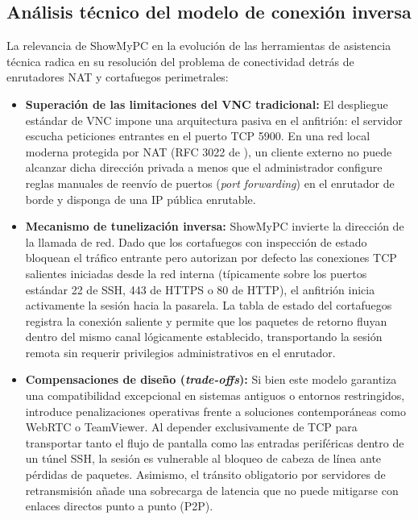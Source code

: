 \documentclass[12pt]{article}
\begin{document}
\subsection{Análisis técnico del modelo de conexión inversa}\label{sec:showmypcConexionInversa}

La relevancia de ShowMyPC en la evolución de las herramientas de asistencia técnica radica en su resolución del problema de conectividad detrás de enrutadores NAT y cortafuegos perimetrales:
\begin{itemize}[noitemsep, topsep=4pt]
    \item \textbf{Superación de las limitaciones del VNC tradicional:} El despliegue estándar de VNC impone una arquitectura pasiva en el anfitrión: el servidor escucha peticiones entrantes en el puerto TCP 5900. En una red local moderna protegida por NAT (RFC 3022 de \textcite{rfc3022}), un cliente externo no puede alcanzar dicha dirección privada a menos que el administrador configure reglas manuales de reenvío de puertos (\textit{port forwarding}) en el enrutador de borde y disponga de una IP pública enrutable.
    \item \textbf{Mecanismo de tunelización inversa:} ShowMyPC invierte la dirección de la llamada de red. Dado que los cortafuegos con inspección de estado bloquean el tráfico entrante pero autorizan por defecto las conexiones TCP salientes iniciadas desde la red interna (típicamente sobre los puertos estándar 22 de SSH, 443 de HTTPS o 80 de HTTP), el anfitrión inicia activamente la sesión hacia la pasarela. La tabla de estado del cortafuegos registra la conexión saliente y permite que los paquetes de retorno fluyan dentro del mismo canal lógicamente establecido, transportando la sesión remota sin requerir privilegios administrativos en el enrutador.
    \item \textbf{Compensaciones de diseño (\textit{trade-offs}):} Si bien este modelo garantiza una compatibilidad excepcional en sistemas antiguos o entornos restringidos, introduce penalizaciones operativas frente a soluciones contemporáneas como WebRTC o TeamViewer. Al depender exclusivamente de TCP para transportar tanto el flujo de pantalla como las entradas periféricas dentro de un túnel SSH, la sesión es vulnerable al bloqueo de cabeza de línea ante pérdidas de paquetes. Asimismo, el tránsito obligatorio por servidores de retransmisión añade una sobrecarga de latencia que no puede mitigarse con enlaces directos punto a punto (P2P).
\end{itemize}
\end{document}
